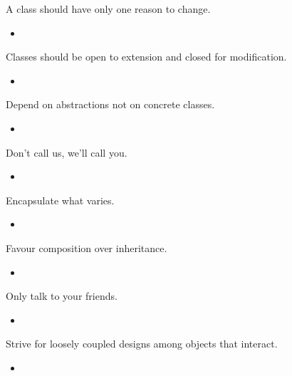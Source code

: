 \documentclass{beamer}
\begin{document}
\begin{frame}[plain]
    \vspace{0cm}
    \begin{columns}
        \column{\dimexpr\paperwidth-40pt}
        
    \end{columns}
\end{frame}

\begin{frame}{A class should have only one reason to change.}
    \begin{itemize}
        \item
    \end{itemize}
\end{frame}

\begin{frame}{Classes should be open to extension and closed for modification.}
    \begin{itemize}
        \item
    \end{itemize}
\end{frame}

\begin{frame}{Depend on abstractions not on concrete classes.}
    \begin{itemize}
        \item
    \end{itemize}
\end{frame}

\begin{frame}{Don't call us, we'll call you.}
    \begin{itemize}
        \item
    \end{itemize}
\end{frame}

\begin{frame}{Encapsulate what varies.}
    \begin{itemize}
        \item
    \end{itemize}
\end{frame}

\begin{frame}{Favour composition over inheritance.}
    \begin{itemize}
        \item
    \end{itemize}
\end{frame}

\begin{frame}{Only talk to your friends.}
    \begin{itemize}
        \item
    \end{itemize}
\end{frame}

\begin{frame}{Strive for loosely coupled designs among objects that interact.}
    \begin{itemize}
        \item
    \end{itemize}
\end{frame}
\end{document}
